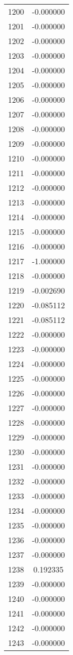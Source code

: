\documentclass[12pt]{article}
\begin{document}
\begin{longtable}{@{}cc@{}}
1200 & -0.000000 \\
1201 & -0.000000 \\
1202 & -0.000000 \\
1203 & -0.000000 \\
1204 & -0.000000 \\
1205 & -0.000000 \\
1206 & -0.000000 \\
1207 & -0.000000 \\
1208 & -0.000000 \\
1209 & -0.000000 \\
1210 & -0.000000 \\
1211 & -0.000000 \\
1212 & -0.000000 \\
1213 & -0.000000 \\
1214 & -0.000000 \\
1215 & -0.000000 \\
1216 & -0.000000 \\
1217 & -1.000000 \\
1218 & -0.000000 \\
1219 & -0.002690 \\
1220 & -0.085112 \\
1221 & -0.085112 \\
1222 & -0.000000 \\
1223 & -0.000000 \\
1224 & -0.000000 \\
1225 & -0.000000 \\
1226 & -0.000000 \\
1227 & -0.000000 \\
1228 & -0.000000 \\
1229 & -0.000000 \\
1230 & -0.000000 \\
1231 & -0.000000 \\
1232 & -0.000000 \\
1233 & -0.000000 \\
1234 & -0.000000 \\
1235 & -0.000000 \\
1236 & -0.000000 \\
1237 & -0.000000 \\
1238 & 0.192335 \\
1239 & -0.000000 \\
1240 & -0.000000 \\
1241 & -0.000000 \\
1242 & -0.000000 \\
1243 & -0.000000 \\

\end{longtable}
\end{document}
